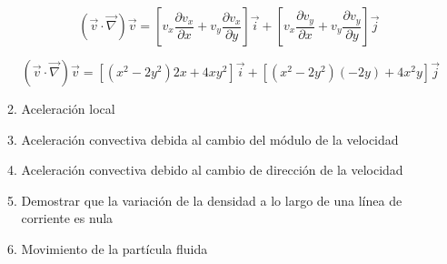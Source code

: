 \begin{enumerate}
\begin{enumerate}
		\[\left(\vec{v}\cdot\vec{\nabla}\right)\vec{v}=\left[v_x\frac{\partial v_x}{\partial x} +v_y\frac{\partial v_x}{\partial y}\right]\vec{i}+\left[v_x\frac{\partial v_y}{\partial x} +v_y\frac{\partial v_y}{\partial y}\right]\vec{j}\]
		
		\[\left(\vec{v}\cdot\vec{\nabla}\right)\vec{v}=\left[(x^2-2y^2)2x+4xy^2\right]\vec{i}+\left[(x^2-2y^2)(-2y)+4x^2y\right]\vec{j}\]

		\item Aceleración local
		\item Aceleración convectiva debida al cambio del módulo de la velocidad
		\item Aceleración convectiva debido al cambio de dirección de la velocidad
		\item Demostrar que la variación de la densidad a lo largo de una línea de corriente es nula
		\item  Movimiento de la partícula fluida
		
	\end{enumerate}
\end{enumerate}